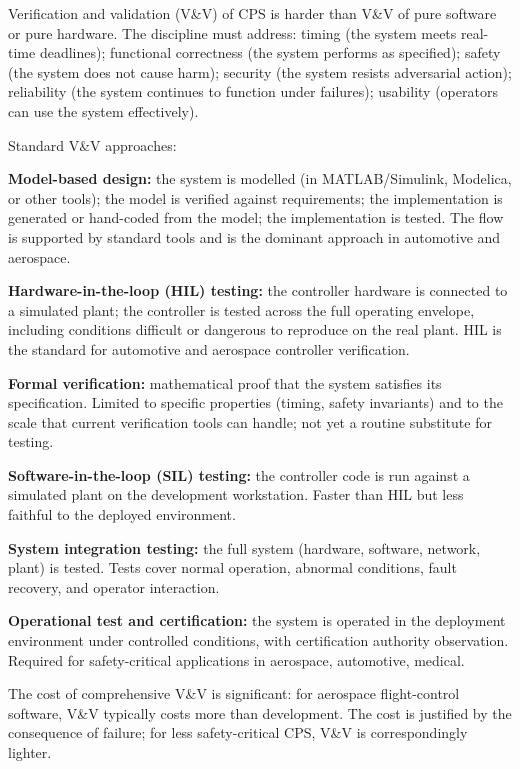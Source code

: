 Verification and validation (V\&V) of CPS is harder than V\&V of pure software or pure hardware. The discipline must address: timing (the system meets real-time deadlines); functional correctness (the system performs as specified); safety (the system does not cause harm); security (the system resists adversarial action); reliability (the system continues to function under failures); usability (operators can use the system effectively).

Standard V\&V approaches:

\textbf{Model-based design:} the system is modelled (in MATLAB/Simulink, Modelica, or other tools); the model is verified against requirements; the implementation is generated or hand-coded from the model; the implementation is tested. The flow is supported by standard tools and is the dominant approach in automotive and aerospace.

\textbf{Hardware-in-the-loop (HIL) testing:} the controller hardware is connected to a simulated plant; the controller is tested across the full operating envelope, including conditions difficult or dangerous to reproduce on the real plant. HIL is the standard for automotive and aerospace controller verification.

\textbf{Formal verification:} mathematical proof that the system satisfies its specification. Limited to specific properties (timing, safety invariants) and to the scale that current verification tools can handle; not yet a routine substitute for testing.

\textbf{Software-in-the-loop (SIL) testing:} the controller code is run against a simulated plant on the development workstation. Faster than HIL but less faithful to the deployed environment.

\textbf{System integration testing:} the full system (hardware, software, network, plant) is tested. Tests cover normal operation, abnormal conditions, fault recovery, and operator interaction.

\textbf{Operational test and certification:} the system is operated in the deployment environment under controlled conditions, with certification authority observation. Required for safety-critical applications in aerospace, automotive, medical.

The cost of comprehensive V\&V is significant: for aerospace flight-control software, V\&V typically costs more than development. The cost is justified by the consequence of failure; for less safety-critical CPS, V\&V is correspondingly lighter.


